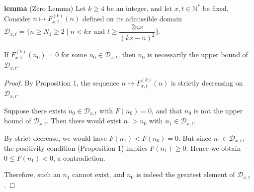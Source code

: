 \documentclass[12pt]{article}
\begin{document}
\noindent\textbf{lemma} (Zero Lemma) 
Let \(k \ge 4\) be an integer, and let \(x,t \in \mathbb{N}^*\) be fixed. Consider \(n \mapsto F_{x,t}^{(k)}(n)\) defined on its admissible domain 
\(\mathcal{D}_{x,t} = \{ n \ge N_1\ge 2 \mid n < kx \text{ and } t \ge \dfrac{2nx}{(kx-n)^2} \}\).

If \(F_{x,t}^{(k)}(n_0) = 0\) for some \(n_0 \in \mathcal{D}_{x,t}\), then \(n_0\) is necessarily the upper bound of \(\mathcal{D}_{x,t}\).


\begin{proof}
By Proposition 1, the sequence \(n \mapsto F_{x,t}^{(k)}(n)\) is strictly decreasing on \(\mathcal{D}_{x,t}\).

Suppose there exists \(n_0 \in \mathcal{D}_{x,t}\) with \(F(n_0)=0\), and that \(n_0\) is not the upper bound of \(\mathcal{D}_{x,t}\). Then there would exist \(n_1 > n_0\) with \(n_1 \in \mathcal{D}_{x,t}\). 

By strict decrease, we would have \(F(n_1) < F(n_0) = 0\). 
But since \(n_1 \in \mathcal{D}_{x,t}\), the positivity condition (Proposition 1) implies \(F(n_1) \ge 0\). Hence we obtain \(0 \le F(n_1) < 0\), a contradiction.

Therefore, such an \(n_1\) cannot exist, and \(n_0\) is indeed the greatest element of \(\mathcal{D}_{x,t}\).
\end{proof}
\end{document}
